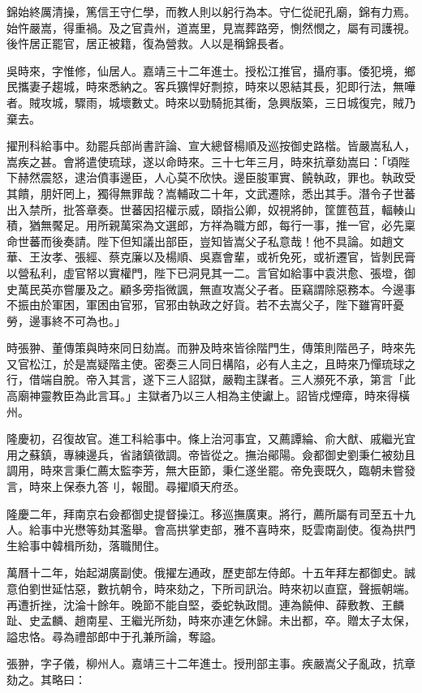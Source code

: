 \begin{pinyinscope}
錦始終厲清操，篤信王守仁學，而教人則以躬行為本。守仁從祀孔廟，錦有力焉。始忤嚴嵩，得重禍。及之官貴州，道嵩里，見嵩葬路旁，惻然憫之，屬有司護視。後忤居正罷官，居正被籍，復為營救。人以是稱錦長者。

吳時來，字惟修，仙居人。嘉靖三十二年進士。授松江推官，攝府事。倭犯境，鄉民攜妻子趨城，時來悉納之。客兵獷悍好剽掠，時來以恩結其長，犯即行法，無嘩者。賊攻城，驟雨，城壞數丈。時來以勁騎扼其衝，急興版築，三日城復完，賊乃棄去。

擢刑科給事中。劾罷兵部尚書許論、宣大總督楊順及巡按御史路楷。皆嚴嵩私人，嵩疾之甚。會將遣使琉球，遂以命時來。三十七年三月，時來抗章劾嵩曰：「頃陛下赫然震怒，逮治僨事邊臣，人心莫不欣快。邊臣朘軍實、饒執政，罪也。執政受其饋，朋奸罔上，獨得無罪哉？嵩輔政二十年，文武遷除，悉出其手。潛令子世蕃出入禁所，批答章奏。世蕃因招權示威，頤指公卿，奴視將帥，筐篚苞苴，輻輳山積，猶無饜足。用所親萬寀為文選郎，方祥為職方郎，每行一事，推一官，必先稟命世蕃而後奏請。陛下但知議出部臣，豈知皆嵩父子私意哉！他不具論。如趙文華、王汝孝、張經、蔡克廉以及楊順、吳嘉會輩，或祈免死，或祈遷官，皆剝民膏以營私利，虛官帑以實權門，陛下已洞見其一二。言官如給事中袁洪愈、張墱，御史萬民英亦嘗屢及之。顧多旁指微諷，無直攻嵩父子者。臣竊謂除惡務本。今邊事不振由於軍困，軍困由官邪，官邪由執政之好貨。若不去嵩父子，陛下雖宵旰憂勞，邊事終不可為也。」

時張翀、董傳策與時來同日劾嵩。而翀及時來皆徐階門生，傳策則階邑子，時來先又官松江，於是嵩疑階主使。密奏三人同日構陷，必有人主之，且時來乃憚琉球之行，借端自脫。帝入其言，遂下三人詔獄，嚴鞫主謀者。三人瀕死不承，第言「此高廟神靈教臣為此言耳。」主獄者乃以三人相為主使讞上。詔皆戍煙瘴，時來得橫州。

隆慶初，召復故官。進工科給事中。條上治河事宜，又薦譚綸、俞大猷、戚繼光宜用之蘇鎮，專練邊兵，省諸鎮徵調。帝皆從之。撫治鄖陽。僉都御史劉秉仁被劾且調用，時來言秉仁薦太監李芳，無大臣節，秉仁遂坐罷。帝免喪既久，臨朝未嘗發言，時來上保泰九答刂，報聞。尋擢順天府丞。

隆慶二年，拜南京右僉都御史提督操江。移巡撫廣東。將行，薦所屬有司至五十九人。給事中光懋等劾其濫舉。會高拱掌吏部，雅不喜時來，貶雲南副使。復為拱門生給事中韓楫所劾，落職閒住。

萬曆十二年，始起湖廣副使。俄擢左通政，歷吏部左侍郎。十五年拜左都御史。誠意伯劉世延怙惡，數抗朝令，時來劾之，下所司訊治。時來初以直竄，聲振朝端。再遭折挫，沈淪十餘年。晚節不能自堅，委蛇執政間。連為饒伸、薛敷教、王麟趾、史孟麟、趙南星、王繼光所劾，時來亦連乞休歸。未出都，卒。贈太子太保，謚忠恪。尋為禮部郎中于孔兼所論，奪謚。

張翀，字子儀，柳州人。嘉靖三十二年進士。授刑部主事。疾嚴嵩父子亂政，抗章劾之。其略曰：


\end{pinyinscope}
